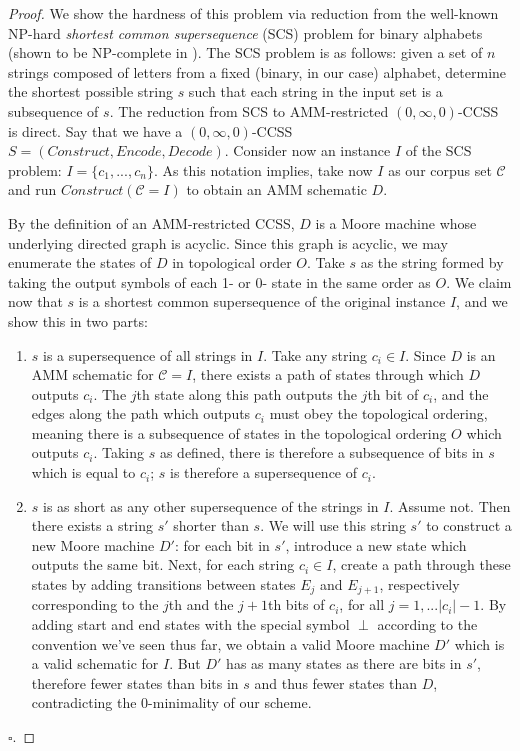 \documentclass{article}
\theoremstyle{definition}
\begin{document}
\begin{proof}
We show the hardness of this problem via reduction from the well-known NP-hard 
\textit{shortest common supersequence} (SCS) problem for binary alphabets
(shown to be NP-complete in 
\cite{SCSHard}).  The SCS problem is as follows: given a set of $n$ strings composed 
of letters from a fixed (binary, in our case) alphabet, 
determine the shortest possible string $s$ such that each string in the input 
set is a subsequence of $s$.
\newline\newline
The reduction from SCS to AMM-restricted $(0,\infty,0)$-CCSS is direct.  Say 
that we have a $(0,\infty,0)$-CCSS $S=(Construct, Encode, Decode)$.  Consider 
now an instance $I$ of the SCS problem: $I=\{c_1,...,c_n\}$.
As this notation implies, take now $I$ as our corpus set $\mathcal{C}$ and run
$Construct(\mathcal{C}=I)$ to obtain an AMM schematic $D$.  

By the definition 
of an AMM-restricted CCSS, $D$ is a Moore machine whose underlying directed 
graph is acyclic.  Since this graph is acyclic, we may enumerate the states 
of $D$ in topological order $O$.  Take $s$ as the string formed by taking the 
output symbols of each 1- or 0- state in the same order as $O$.  We claim now that 
$s$ is a shortest common supersequence of the original instance $I$, and we show 
this in two parts:

\begin{enumerate}
\item{$s$ is a supersequence of all strings in $I$.  Take any string $c_i \in I$.  
Since $D$ is an AMM schematic 
for $\mathcal{C}=I$, there exists a path of states through which $D$ outputs 
$c_i$.  The $j$th state along this path outputs the $j$th bit of $c_i$, and the 
edges along the path which outputs $c_i$ must obey the topological ordering, meaning 
there is a subsequence of states in the topological ordering $O$ which outputs 
$c_i$.  Taking $s$ as defined, there is therefore a subsequence of bits in $s$ 
which is equal to $c_i$; $s$ is therefore a supersequence of $c_i$. 
}
\item{$s$ is as short as any other supersequence of the strings in $I$.  Assume 
not.  Then there exists a string $s'$ shorter than $s$.  We will use this string 
$s'$ to construct a new Moore machine $D'$: for each bit in $s'$, introduce a new 
state which outputs the same bit.  Next, for each string $c_i \in I$, create a 
path through these states by adding transitions between states $E_j$ and $E_{j+1}$, 
respectively corresponding to the $j$th and the $j+1$th bits of $c_i$, 
for all $j=1,...\lvert c_i\rvert - 1$.  By adding start and end states 
with the special symbol $\perp$ according to the convention we've seen thus far, 
we obtain a valid Moore machine $D'$ which is a valid schematic for $I$.  But $D'$
has as many states as there are bits in $s'$, therefore fewer states than bits 
in $s$ and thus fewer states than $D$, contradicting the 0-minimality of our scheme.
}
\end{enumerate}

$\square$.
\end{proof}
\end{document}
